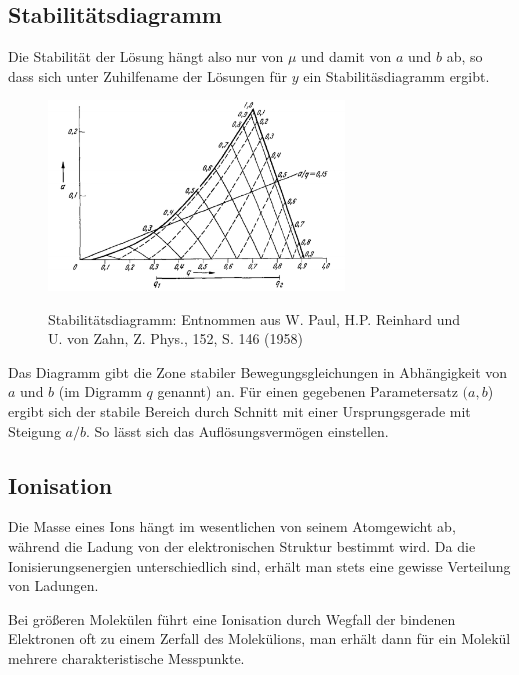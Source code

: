 \documentclass[a4paper,german,12pt,smallheadings]{scrartcl}
\newcommand\invisiblesection[1]{%
    \refstepcounter{section}%
      \addcontentsline{toc}{section}{\protect\numberline{\thesection}#1}%
        \sectionmark{#1}}
\begin{document}
\subsection{Stabilitätsdiagramm}

Die Stabilität der Lösung hängt also nur von $\mu$ und damit von $a$ und $b$
ab, so dass sich unter Zuhilfename der Lösungen für $y$ ein Stabilitäsdiagramm ergibt.

\begin{figure}[H]
  \includegraphics[width=0.7\textwidth]{stabidiag.png}
	\label{stabidiag}
  \caption{Stabilitätsdiagramm: Entnommen aus W. Paul, H.P. Reinhard und U. von Zahn, Z. Phys., 152,
S. 146 (1958)}
\end{figure}

Das Diagramm gibt die Zone stabiler Bewegungsgleichungen in Abhängigkeit von
$a$ und $b$ (im Digramm $q$ genannt) an. Für einen gegebenen Parametersatz
$(a,b$) ergibt sich der stabile Bereich durch Schnitt mit einer Ursprungsgerade
mit Steigung $a/b$. So lässt sich das Auflösungsvermögen einstellen.

\subsection{Ionisation}

Die Masse eines Ions hängt im wesentlichen von seinem Atomgewicht ab, während
die Ladung von der elektronischen Struktur bestimmt wird. Da die
Ionisierungsenergien unterschiedlich sind, erhält man stets eine gewisse
Verteilung von Ladungen.

Bei größeren Molekülen führt eine Ionisation durch Wegfall der bindenen
Elektronen oft zu einem Zerfall des Molekülions, man erhält dann für ein
Molekül mehrere charakteristische Messpunkte.



%
%  
%
%
\end{document}
